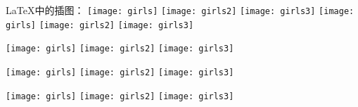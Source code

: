\documentclass{ctexart} %
\begin{document}
	
	\LaTeX{}中的插图：
	\texttt{[image: girls]}
	\texttt{[image: girls2]}
	\texttt{[image: girls3]}
	\texttt{[image: girls]}
	\texttt{[image: girls2]}
	\texttt{[image: girls3]}
	
	
	\texttt{[image: girls]}
	\texttt{[image: girls2]}
	\texttt{[image: girls3]}
	
	\texttt{[image: girls]}
	\texttt{[image: girls2]}
	\texttt{[image: girls3]}
	
	\texttt{[image: girls]}
	\texttt{[image: girls2]}
	\texttt{[image: girls3]}
	
	
	
\end{document}
